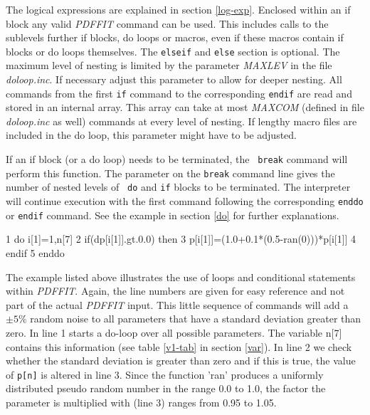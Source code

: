 The logical expressions are explained in section \ref{log-exp}.
Enclosed within an if block any valid {\it PDFFIT} command can be
used.  This includes calls to the sublevels further if blocks, do
loops or macros, even if these macros contain if blocks or do loops
themselves.  The {\tt elseif} and {\tt else} section is optional.
The maximum level of nesting is limited by the parameter {\it
MAXLEV} in the file {\it doloop.inc}. If necessary adjust this
parameter to allow for deeper nesting.  All commands from the first
{\tt if} command to the corresponding {\tt endif} are read and
stored in an internal array. This array can take at most {\it
MAXCOM} (defined in file {\it doloop.inc} as well) commands at every
level of nesting.  If lengthy macro files are included in the do
loop, this parameter might have to be adjusted. \par

If an if block (or a do loop) needs to be terminated, the {\tt
break} command will perform this function.  The parameter on the
{\tt break} command line gives the number of nested levels of {\tt
do} and {\tt if} blocks to be terminated. The interpreter will
continue execution with the first command following the
corresponding {\tt enddo} or {\tt endif} command.  See the example
in section \ref{do} for further explanations. \par

\begin{MacVerbatim}
     1  do i[1]=1,n[7]
     2    if(dp[i[1]].gt.0.0) then
     3      p[i[1]]=(1.0+0.1*(0.5-ran(0)))*p[i[1]]
     4    endif
     5  enddo
\end{MacVerbatim}

The example listed above illustrates the use of loops and
conditional statements within {\it PDFFIT}.  Again, the line numbers
are given for easy reference and not part of the actual {\it PDFFIT}
input. This little sequence of commands will add a $\pm 5\%$ random
noise to all parameters that have a standard deviation greater than
zero. In line 1 starts a do-loop over all possible parameters.  The
variable n[7] contains this information (see table \ref{v1-tab} in
section \ref{var}). In line 2 we check whether the standard
deviation is greater than zero and if this is true, the value of
{\tt p[n]} is altered in line 3. Since the function 'ran' produces a
uniformly distributed pseudo random number in the range 0.0 to 1.0,
the factor the parameter is multiplied with (line 3) ranges from
0.95 to 1.05.


